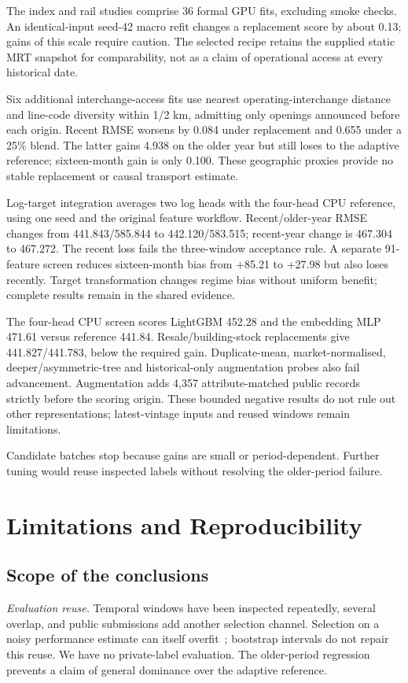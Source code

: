 \documentclass[conference]{IEEEtran}
\begin{document}
The index and rail studies comprise 36 formal GPU fits, excluding smoke checks. An identical-input seed-42 macro refit changes a replacement score by about 0.13; gains of this scale require caution. The selected recipe retains the supplied static MRT snapshot for comparability, not as a claim of operational access at every historical date.

Six additional interchange-access fits use nearest operating-interchange distance and line-code diversity within 1/2 km, admitting only openings announced before each origin. Recent RMSE worsens by 0.084 under replacement and 0.655 under a 25\% blend. The latter gains 4.938 on the older year but still loses to the adaptive reference; sixteen-month gain is only 0.100. These geographic proxies provide no stable replacement or causal transport estimate.

Log-target integration averages two log heads with the four-head CPU reference, using one seed and the original feature workflow. Recent/older-year RMSE changes from 441.843/585.844 to 442.120/583.515; recent-year change is 467.304 to 467.272. The recent loss fails the three-window acceptance rule. A separate 91-feature screen reduces sixteen-month bias from +85.21 to +27.98 but also loses recently. Target transformation changes regime bias without uniform benefit; complete results remain in the shared evidence.

The four-head CPU screen scores LightGBM 452.28 and the embedding MLP 471.61 versus reference 441.84. Resale/building-stock replacements give 441.827/441.783, below the required gain. Duplicate-mean, market-normalised, deeper/asymmetric-tree and historical-only augmentation probes also fail advancement. Augmentation adds 4,357 attribute-matched public records~\cite{hdb-rental} strictly before the scoring origin. These bounded negative results do not rule out other representations; latest-vintage inputs and reused windows remain limitations.

Candidate batches stop because gains are small or period-dependent. Further tuning would reuse inspected labels without resolving the older-period failure.

\section{Limitations and Reproducibility}
\subsection{Scope of the conclusions}
\textit{Evaluation reuse.} Temporal windows have been inspected repeatedly, several overlap, and public submissions add another selection channel. Selection on a noisy performance estimate can itself overfit~\cite{Cawley_2010}; bootstrap intervals do not repair this reuse. We have no private-label evaluation. The older-period regression prevents a claim of general dominance over the adaptive reference.
\end{document}
